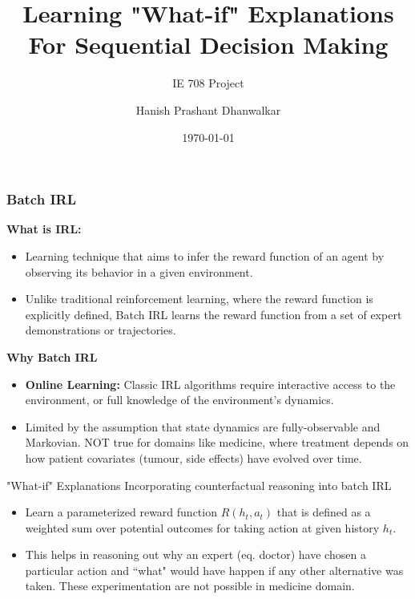 \documentclass{beamer}
\title{Learning "What-if" Explanations For Sequential Decision Making}
\subtitle{IE 708 Project}
\author{Hanish Prashant Dhanwalkar}
\date{\today}
\begin{document}
\begin{frame}
\titlepage
\end{frame}

\begin{frame}
\frametitle{Batch IRL}
    \textbf{What is IRL:}
    \begin{itemize}
        \item Learning technique that aims to infer the reward function of an agent by observing its behavior in a given environment.
        \item Unlike traditional reinforcement learning, where the reward function is explicitly defined, Batch IRL learns the reward function from a set of expert demonstrations or trajectories.
    \end{itemize}
    
    \textbf{Why Batch IRL}
    \begin{itemize}
        \item \textbf{Online Learning:} Classic IRL algorithms require interactive access to the environment, or full knowledge of the environment’s dynamics.
        \item Limited by the assumption that state dynamics are fully-observable and Markovian. NOT true for domains like medicine, where treatment depends on how patient covariates (tumour, side effects) have evolved over time. 
    \end{itemize}

\end{frame}

\begin{frame}{"What-if" Explanations}
    Incorporating counterfactual reasoning into batch IRL

    \begin{itemize}
        \item Learn a parameterized reward function $R(h_t, a_t)$ that is defined as a weighted sum over potential outcomes for taking action at given history $h_t$.

        \item This helps in reasoning out why an expert (eq. doctor) have chosen a particular action and ``what" would have happen if any other alternative was taken. These experimentation are not possible in medicine domain.
    \end{itemize}
    
\end{frame}
\end{document}
